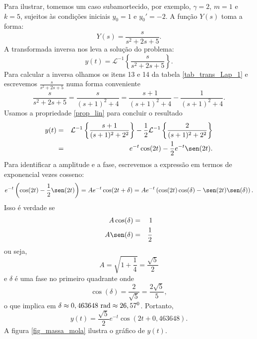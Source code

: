 Para ilustrar, tomemos um caso subamortecido, por exemplo, $\gamma=2$, $m=1$ e $k=5$, sujeitos às condições iniciais $y_0=1$ e $y_0'=-2$. A função $Y(s)$ toma a forma:
\begin{equation}
Y(s)=\frac{s}{s^2+2 s +5}.
\end{equation}
A transformada inversa nos leva a solução do problema:
\begin{equation}
y(t)=\mathcal{L}^{-1}\left\{\frac{s}{s^2+2 s +5}\right\}.
\end{equation}
Para calcular a inversa olhamos os itens 13 e 14 da tabela \ref{tab_trans_Lap_1} e escrevemos $\frac{s}{s^2+2 s +5}$ numa forma conveniente
\begin{equation}
\frac{s}{s^2+2 s +5}=\frac{s}{(s+1)^2 +4}=\frac{s+1}{(s+1)^2 +4}-\frac{1}{(s+1)^2 +4}.
\end{equation}
Usamos a propriedade \ref{prop_lin} para concluir o resultado
\begin{eqnarray*}
y(t)&=&\mathcal{L}^{-1}\left\{\frac{s+1}{(s+1)^2 +2^2}\right\}-\frac{1}{2}\mathcal{L}^{-1}\left\{\frac{2}{(s+1)^2 +2^2}\right\}\\
&=&e^{-t}\cos(2t)-\frac{1}{2}e^{-t}\sen(2t).
\end{eqnarray*}
Para identificar a amplitude e a fase, escrevemos a expressão em termos de exponencial vezes cosseno:
\begin{equation}
e^{-t}\left(\cos(2t)-\frac{1}{2}\sen(2t)\right)=Ae^{-t}\cos(2t+\delta)=Ae^{-t}\left(\cos(2t)\cos(\delta)-\sen(2t)\sen(\delta)\right).
\end{equation}
Isso é verdade se
\begin{eqnarray*}
A\cos(\delta)&=&1\\
A\sen(\delta)&=&\frac{1}{2}
\end{eqnarray*}
ou seja,
\begin{equation}
A=\sqrt{1+\frac{1}{4}}=\frac{\sqrt{5}}{2}
\end{equation}
e $\delta$ é uma fase no primeiro quadrante onde
\begin{equation}
\cos(\delta)=\frac{2}{\sqrt{5}}=\frac{2\sqrt{5}}{5},
\end{equation}
o que implica em $\delta\approx 0,463648\ \hbox{rad} \approx 26,57^0$. Portanto,
\begin{equation}
y(t)=\frac{\sqrt{5}}{2}e^{-t}\cos(2t+0,463648).
\end{equation}
A figura \ref{fig_massa_mola} ilustra o gráfico de $y(t)$.
